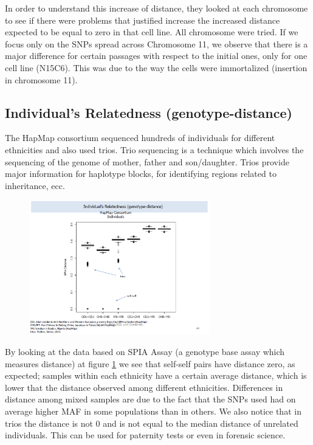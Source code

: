 In order to understand this increase of distance, they looked at each chromosome to see if there were problems that justified increase the increased distance expected to be equal to zero in that cell line. All chromosome were tried. If we focus only on the SNPs spread across Chromosome 11, we observe that there is a major difference for certain passages with respect to the initial ones, only for one cell line (N15C6). This was due to the way the cells were immortalized (insertion in chromosome 11).


\subsection*{Individual's Relatedness (genotype-distance)}

The HapMap consortium sequenced hundreds of individuals for different ethnicities and also used trios. Trio sequencing is a technique which involves the sequencing of the genome of mother, father and son/daughter. Trios provide major information for haplotype blocks, for identifying regions related to inheritance, ecc. 

\begin{figure}
	\centering
	\includegraphics[width = 0.7\textwidth]{trios.PNG}
	\caption{\label{fig: trios}}
\end{figure}

By looking at the data based on SPIA Assay (a genotype base assay which measures distance) at figure \ref*{fig: trios} we see that self-self pairs have distance zero, as expected; samples within each ethnicity have a certain average distance, which is lower that the distance observed among different ethnicities. Differences in distance among mixed samples are due to the fact that the SNPs used had on average higher MAF in some populations than in others. We also notice that in trios the distance is not 0 and is not equal to the median distance of unrelated individuals. This can be used for paternity tests or even in forensic science.

